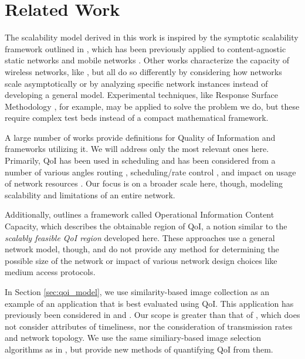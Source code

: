 \section{Related Work}
\label{sec:related_work}

The scalability model derived in this work is inspired by the symptotic scalability framework outlined in \cite{symptotics_tech_report}, which has been previously applied to content-agnostic static networks \cite{symptotics_framework_scalability} and mobile networks \cite{scal_analysis_mobility}.  Other works characterize the capacity of wireless networks, like \cite{li_capacity, gupta2000capacity}, but all do so differently by considering how networks scale asymptotically or by analyzing specific network instances instead of developing a general model.  Experimental techniques, like Response Surface Methodology \cite{khuri2010response}, for example, may be applied to solve the problem we do, but these require complex test beds instead of a compact mathematical framework.

A large number of works provide definitions for Quality of Information and frameworks utilizing it.  We will address only the most relevant ones here.  Primarily, QoI has been used in scheduling and has been considered from a number of various angles routing \cite{quality_aware_routing_tan}, scheduling/rate control \cite{toward_qoi_rate_control,explor_vs_exploit}, and impact on usage of network resources \cite{qoi_aware_mobile_apps}. Our focus is on a broader scale here, though, modeling scalability and limitations of an entire network.


Additionally, \cite{oicc_journal} outlines a framework called Operational Information Content Capacity, which describes the obtainable region of QoI, a notion similar to the \emph{scalably feasible QoI region} developed here.  These approaches use a general network model, though, and do not provide any method for determining the possible size of the network or impact of various network design choices like medium access protocols.   %

In Section \ref{sec:qoi_model}, we use similarity-based image collection as an example of an application that is best evaluated using QoI.  This application has previously been considered in \cite{photonet} and \cite{mediascope}. Our scope is greater than that of \cite{photonet}, which does not consider attributes of timeliness, nor the consideration of transmission rates and network topology.  We use the same similiary-based image selection algorithms as in \cite{mediascope}, but provide new methods of quantifying QoI from them.%
